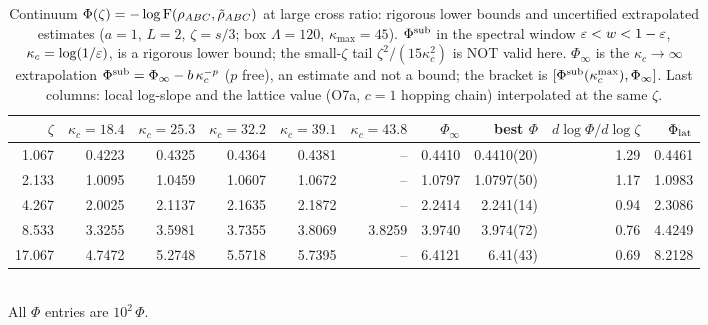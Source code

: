 \begin{table}[ht]\centering\small
\caption{Continuum \(\Phi(\zeta)=-\log\operatorname{F}(\rho_{ABC},\tilde\rho_{ABC})\) at large cross ratio: rigorous lower bounds and uncertified extrapolated estimates (\(a=1\), \(L=2\), \(\zeta=s/3\); box \(\Lambda=120\), \(\kappa_{\max}=45\)). \(\Phi^{\rm sub}\) in the spectral window \(\varepsilon<w<1-\varepsilon\), \(\kappa_c=\log(1/\varepsilon)\), is a rigorous lower bound; the small-\(\zeta\) tail \(\zeta^2/(15\kappa_c^2)\) is NOT valid here. \(\Phi_\infty\) is the \(\kappa_c\to\infty\) extrapolation \(\Phi^{\rm sub}=\Phi_\infty-b\,\kappa_c^{-p}\) (\(p\) free), an estimate and not a bound; the bracket is \([\Phi^{\rm sub}(\kappa_c^{\max}),\Phi_\infty]\). Last columns: local log-slope and the lattice value (O7a, \(c=1\) hopping chain) interpolated at the same \(\zeta\).}\label{tab:largezeta}
\begin{tabular}{rrrrrr r r r r}\toprule
\(\zeta\) & \(\kappa_c{=}18.4\) & \(\kappa_c{=}25.3\) & \(\kappa_c{=}32.2\) & \(\kappa_c{=}39.1\) & \(\kappa_c{=}43.8\) & \(\Phi_\infty\) & best \(\Phi\) & \(d\log\Phi/d\log\zeta\) & \(\Phi_{\rm lat}\) \\\midrule
1.067 & 0.4223 & 0.4325 & 0.4364 & 0.4381 & -- & 0.4410 & 0.4410(20) & 1.29 & 0.4461 \\
2.133 & 1.0095 & 1.0459 & 1.0607 & 1.0672 & -- & 1.0797 & 1.0797(50) & 1.17 & 1.0983 \\
4.267 & 2.0025 & 2.1137 & 2.1635 & 2.1872 & -- & 2.2414 & 2.241(14) & 0.94 & 2.3086 \\
8.533 & 3.3255 & 3.5981 & 3.7355 & 3.8069 & 3.8259 & 3.9740 & 3.974(72) & 0.76 & 4.4249 \\
17.067 & 4.7472 & 5.2748 & 5.5718 & 5.7395 & -- & 6.4121 & 6.41(43) & 0.69 & 8.2128 \\
\bottomrule\end{tabular}
\\[2pt]\footnotesize All \(\Phi\) entries are \(10^{2}\,\Phi\).
\end{table}
